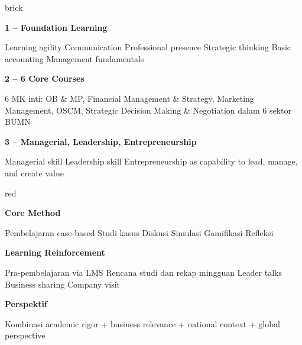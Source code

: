 \begin{infobox}{brick}
\begin{tcbraster}[raster columns=3,raster equal height=rows,raster column skip=2mm]
\begin{tcolorbox}[colback=palered,colframe=palered,boxrule=0pt]
\textbf{1 -- Foundation Learning}\par
Learning agility \textbullet{} Communication \textbullet{} Professional presence \textbullet{} Strategic thinking \textbullet{} Basic accounting \textbullet{} Management fundamentals
\end{tcolorbox}
\begin{tcolorbox}[colback=palered,colframe=palered,boxrule=0pt]
\textbf{2 -- 6 Core Courses}\par
6 MK inti: OB \& MP, Financial Management \& Strategy, Marketing Management, OSCM, Strategic Decision Making \& Negotiation dalam 6 sektor BUMN
\end{tcolorbox}
\begin{tcolorbox}[colback=palered,colframe=palered,boxrule=0pt]
\textbf{3 -- Managerial, Leadership, Entrepreneurship}\par
Managerial skill \textbullet{} Leadership skill \textbullet{} Entrepreneurship as capability to lead, manage, and create value
\end{tcolorbox}
\end{tcbraster}
\end{infobox}

\begin{infobox}{red}
\begin{tcbraster}[raster columns=3,raster equal height=rows,raster column skip=2mm]
\begin{tcolorbox}[colback=palered,colframe=palered,boxrule=0pt]
\textbf{Core Method}\par Pembelajaran case-based \textbullet{} Studi kasus \textbullet{} Diskusi \textbullet{} Simulasi \textbullet{} Gamifikasi \textbullet{} Refleksi
\end{tcolorbox}
\begin{tcolorbox}[colback=palered,colframe=palered,boxrule=0pt]
\textbf{Learning Reinforcement}\par Pra-pembelajaran via LMS \textbullet{} Rencana studi dan rekap mingguan \textbullet{} Leader talks \textbullet{} Business sharing \textbullet{} Company visit
\end{tcolorbox}
\begin{tcolorbox}[colback=palered,colframe=palered,boxrule=0pt]
\textbf{Perspektif}\par Kombinasi academic rigor + business relevance + national context + global perspective
\end{tcolorbox}
\end{tcbraster}
\end{infobox}

